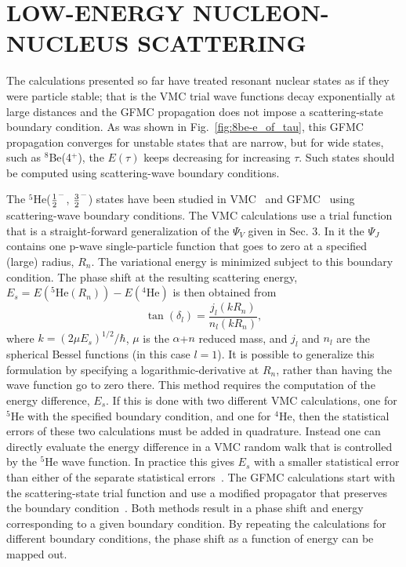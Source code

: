 \section{LOW-ENERGY NUCLEON-NUCLEUS SCATTERING}
\label{sec:scat}

The calculations presented so far have treated resonant nuclear states
as if they were particle stable; that is the VMC trial wave functions
decay exponentially at large distances and the GFMC propagation
does not impose a scattering-state boundary condition.  As was
shown in Fig.~\ref{fig:8be-e_of_tau}, this GFMC propagation converges
for unstable states that are narrow, but for wide states, such as
$^8$Be(4$^+$), the $E(\tau)$ keeps decreasing for increasing $\tau$.
Such states should be computed using scattering-wave boundary conditions.

The $^5$He($\textstyle{1\over2}^-$, $\textstyle{3\over2}^-$) states have been studied
in VMC~\cite{csk87} and GFMC~\cite{cs94} using scattering-wave 
boundary conditions.  The VMC calculations use a trial function
that is a straight-forward generalization of the $\Psi_V$ given
in Sec. 3.  In it the $\Psi_J$ contains one p-wave single-particle function
that goes to zero at a specified (large) radius, $R_n$.  The variational
energy is minimized subject to this boundary condition.  The
phase shift at the resulting scattering energy, 
$E_s=E(^5\mbox{He}(R_n))-E(^4\mbox{He})$ is then obtained from
\begin{equation}
\tan(\delta_l) = \frac{j_l(k R_n)}{n_l(k R_n)},
\end{equation}
where $k = (2 \mu E_s)^{1/2} / \hbar$,
$\mu$ is the $\alpha$+$n$ reduced mass, and $j_l$ and $n_l$ are
the spherical Bessel functions (in this case $l=1$).  It is possible
to generalize this formulation by specifying a logarithmic-derivative
at $R_n$, rather than having the wave function go to zero there.
This method requires the computation of the energy difference, $E_s$.
If this is done with two different VMC calculations, one for $^5$He
with the specified boundary condition, and one for $^4$He, then
the statistical errors of these two calculations must be added
in quadrature.  Instead one can directly evaluate the energy
difference in a VMC random walk that is controlled by the
$^5$He wave function.  In practice this gives $E_s$ with a smaller
statistical error than either of the separate statistical errors~\cite{csk87}.
The GFMC calculations start with the scattering-state trial
function and use a modified propagator that preserves the
boundary condition~\cite{cs94}.  Both methods result in a phase shift
and energy corresponding to a given boundary condition.  By repeating
the calculations for different boundary conditions, the phase shift
as a function of energy can be mapped out.

